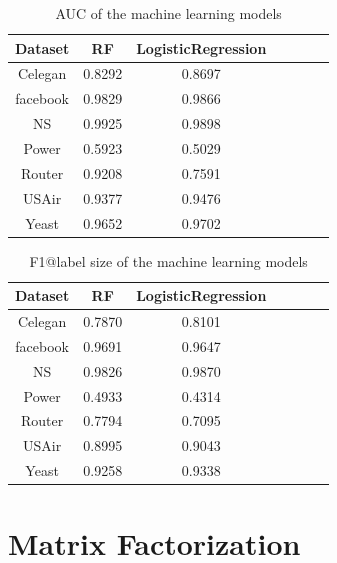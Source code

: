 \documentclass[12pt]{article}
\begin{document}
\begin{table}
	\begin{center}
		\begin{tabular}{|c|c|c|c|c|c|c|}
			\hline
			Dataset & RF & LogisticRegression \\
			\hline
			Celegan&0.8292&0.8697\\
			facebook&0.9829&0.9866\\
			NS&0.9925&0.9898\\
			Power&0.5923&0.5029\\
			Router&0.9208&0.7591\\
			USAir&0.9377&0.9476\\
			Yeast&0.9652&0.9702\\
			\hline
		\end{tabular}
	\end{center}
	\caption{AUC of the machine learning models}
	\label{tab:ensemble_auc}
\end{table}


\begin{table}
	\begin{center}
		\begin{tabular}{|c|c|c|c|c|c|c|}
			\hline
			Dataset & RF & LogisticRegression \\
			\hline
			Celegan&0.7870&0.8101\\
			facebook&0.9691&0.9647\\
			NS&0.9826&0.9870\\
			Power&0.4933&0.4314\\
			Router&0.7794&0.7095\\
			USAir&0.8995&0.9043\\
			Yeast&0.9258&0.9338\\
			\hline
		\end{tabular}
	\end{center}
	\caption{F1@label size of the machine learning models}
	\label{tab:ensemble_f1}
\end{table}


\section{Matrix Factorization}
\end{document}
